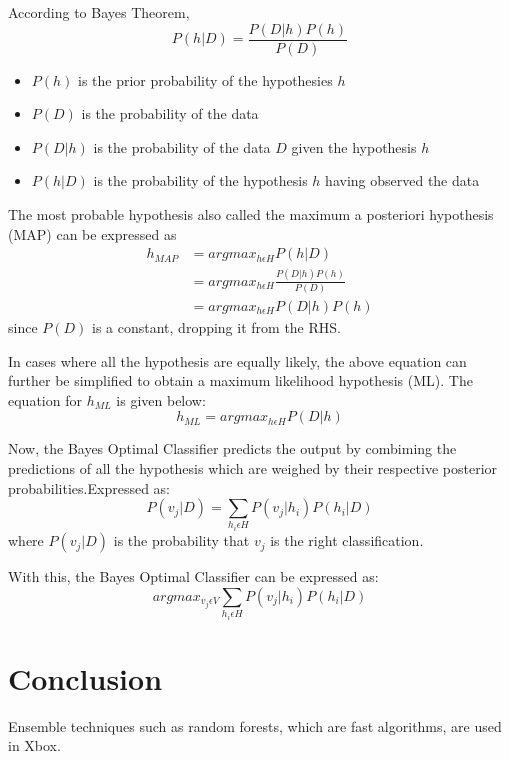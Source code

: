 \documentclass{acmtog} %
\begin{document}
According to Bayes Theorem,
\begin{equation}
	P(h|D) = \frac{P(D|h)P(h)}{P(D)}
	\label{eq:bayesEq}
\end{equation}
\begin{itemize}
	\item $P(h)$ is the prior probability of the hypothesies $h$
	\item $P(D)$ is the probability of the data
	\item $P(D|h)$ is the probability of the data $D$ given the hypothesis $h$
	\item $P(h|D)$ is the probability of the hypothesis $h$ having observed the data
\end{itemize}

The most probable hypothesis also called the maximum a posteriori hypothesis (MAP) can be expressed as
\begin{equation}
	\begin{split}
		h_{MAP} & = argmax_{h \epsilon H} P(h|D) \\
		& = argmax_{h \epsilon H} \frac{P(D|h)P(h)}{P(D)} \\
		& = argmax_{h \epsilon H} P(D|h)P(h)
		\label{eq:mapEq}
	\end{split}
\end{equation}
since $P(D)$ is a constant, dropping it from the RHS.

In cases where all the hypothesis are equally likely, the above equation can further be simplified to obtain a maximum likelihood hypothesis (ML). The equation for $h_{ML}$ is given below:
\begin{equation}
	h_{ML} = argmax_{h \epsilon H} P(D|h)
	\label{eq:mlEq}
\end{equation}

Now, the Bayes Optimal Classifier predicts the output by combiming the predictions of all the hypothesis which are weighed by their respective posterior probabilities.Expressed as:
\begin{equation}
	P(v_j|D) = \sum _{h_i \epsilon H} P(v_j|h_i) P(h_i|D)
	\label{eq:bocEq1}
\end{equation}
where $P(v_j|D)$ is the probability that $v_j$ is the right classification.

With this, the Bayes Optimal Classifier can be expressed as:
\begin{equation}
	argmax_{v_j \epsilon V} \sum _{h_i \epsilon H} P(v_j|h_i) P(h_i|D)
	\label{eq:bocEq2}
\end{equation}
\section{Conclusion}
Ensemble techniques such as random forests, which are fast algorithms, are used in Xbox.



 
\end{document}
